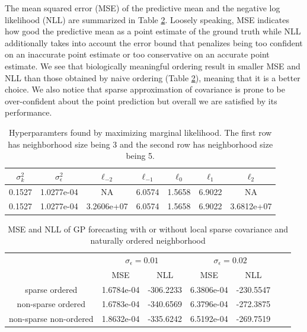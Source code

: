 \documentclass[11pt, reqno]{amsart}
\begin{document}
The mean squared error (MSE) of the predictive mean and the negative log likelihood (NLL) are summarized in Table \ref{tab:MSE-and-NLL}. Loosely speaking, MSE indicates how good the predictive mean as a point estimate of the ground truth while NLL additionally takes into account the error bound that penalizes being too confident on an inaccurate point estimate or too conservative on an accurate point estimate. We see that biologically meaningful ordering result in smaller MSE and NLL than those obtained by naive ordering (Table \ref{tab:MSE-and-NLL}), meaning that it is a better choice. We also notice that sparse approximation of covariance is prone to be over-confident about the point prediction but overall we are satisfied by its performance. 

\begin{table}[h]
\begin{center}
\caption{Hyperparamters found by maximizing marginal likelihood. The first row has neighborhood size being 3 and the second row has neighborhood size being 5.}
\label{tab:length scales}
\vspace*{12pt}
\begin{tabular}{ccccccc} \hline
 $\sigma_{k}^{2}$ & $\sigma_{\epsilon}^{2}$ & $\ell_{-2}$ & $\ell_{-1}$ & $\ell_{0}$ & $\ell_{1}$ & $\ell_{2}$ \\ \hline
0.1527 & 1.0277e-04 & NA & 6.0574 & 1.5658 & 6.9022 & NA\\ 
0.1527 & 1.0277e-04 & 3.2606e+07 & 6.0574 & 1.5658 & 6.9022 & 3.6812e+07\\ \hline
\end{tabular}
\end{center}
\end{table}


\begin{table}[h]
\begin{center}
\caption[MSE and NLL of GP Forecasting with or without Local Sparse Covariance and Naturally Ordered Neighborhood] {MSE and NLL of GP forecasting with or without local sparse covariance and naturally ordered neighborhood}
\label{tab:MSE-and-NLL}
\vspace*{12pt}
\begin{tabular}{ccccccc} \hline
\multirow{2}{*}{} & \multicolumn{2}{c}{$\sigma_{\epsilon}=0.01$} & \multicolumn{2}{c}{$\sigma_{\epsilon}=0.02$} \\
\cmidrule{2-5} \cmidrule{3-5} \cmidrule{4-5} \cmidrule{5-5} 
 & MSE & NLL & MSE & NLL\\ \hline
sparse ordered & 1.6784e-04 & -306.2233 & 6.3806e-04 & -230.5547 \\
non-sparse ordered & 1.6783e-04 & -340.6569 & 6.3796e-04 & -272.3875 \\
non-sparse non-ordered & 1.8632e-04 & -335.6242 & 6.5192e-04 & -269.7519 \\ \hline
\end{tabular}
\end{center}
\end{table}
\end{document}
